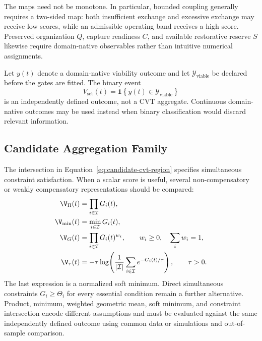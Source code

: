 The maps need not be monotone. In particular, bounded coupling generally requires a two-sided map: both insufficient exchange and excessive exchange may receive low scores, while an admissible operating band receives a high score. Preserved organization \(Q\), capture readiness \(C\), and available restorative reserve \(S\) likewise require domain-native observables rather than intuitive numerical assignments.

Let \(y(t)\) denote a domain-native viability outcome and let \(\mathcal Y_{\mathrm{viable}}\) be declared before the gates are fitted. The binary event
\begin{equation}
    V_{\mathrm{set}}(t)
    =
    \mathbf{1}\!\left\{y(t)\in\mathcal Y_{\mathrm{viable}}\right\}
    \label{eq:independent-viability-event}
\end{equation}
is an independently defined outcome, not a CVT aggregate. Continuous domain-native outcomes may be used instead when binary classification would discard relevant information.

\subsection{Candidate Aggregation Family}

The intersection in Equation~\eqref{eq:candidate-cvt-region} specifies simultaneous constraint satisfaction. When a scalar score is useful, several non-compensatory or weakly compensatory representations should be compared:
\begin{align}
    \V_{\Pi}(t)
    &=
    \prod_{i\in\mathcal I}G_i(t),
    \\
    \V_{\min}(t)
    &=
    \min_{i\in\mathcal I}G_i(t),
    \\
    \V_G(t)
    &=
    \prod_{i\in\mathcal I}G_i(t)^{w_i},
    \qquad
    w_i\geq0,
    \quad
    \sum_iw_i=1,
    \\
    \V_{\tau}(t)
    &=
    -\tau\log\!\left(
        \frac{1}{|\mathcal I|}
        \sum_{i\in\mathcal I}e^{-G_i(t)/\tau}
    \right),
    \qquad \tau>0.
    \label{eq:aggregation-family}
\end{align}
The last expression is a normalized soft minimum. Direct simultaneous constraints \(G_i\geq\Theta_i\) for every essential condition remain a further alternative. Product, minimum, weighted geometric mean, soft minimum, and constraint intersection encode different assumptions and must be evaluated against the same independently defined outcome using common data or simulations and out-of-sample comparison.

